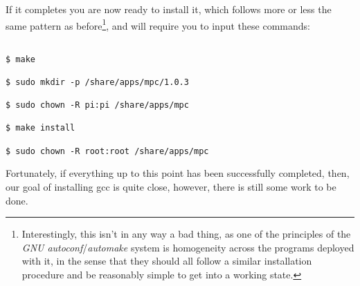 \documentclass[]{article}
\begin{document}
                                                                                                                                                                             If it completes you are now ready to install it, which follows more or less the same pattern as before\footnote{Interestingly, this
                                                                                                                                                                                 isn't in any way a bad thing, as one of the principles of the \textit{GNU autoconf}/\textit{automake} system is homogeneity across the
                                                                                                                                                                                     programs deployed with it, in the sense that they should all follow a similar installation procedure and be reasonably simple to
                                                                                                                                                                                     get into a working state.}, and will require you to input these commands:
                                                                                                                                                                                     \begin{lstlisting}
                                                                                                                                                                                     $ make
                                                                                                                                                                                     $ sudo mkdir -p /share/apps/mpc/1.0.3
                                                                                                                                                                                     $ sudo chown -R pi:pi /share/apps/mpc
                                                                                                                                                                                     $ make install
                                                                                                                                                                                     $ sudo chown -R root:root /share/apps/mpc
                                                                                                                                                                                     \end{lstlisting}
                                                                                                                                                                                     Fortunately, if everything up to this point has been successfully completed, then, our goal of installing gcc is quite close, however,
                                                                                                                                                                                     there is still some work to be done.
\end{document}
